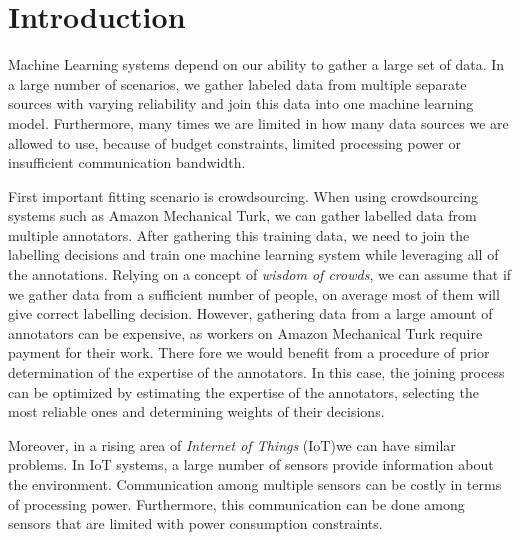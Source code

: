 \documentclass{llncs}
\begin{document}
\section{Introduction}
Machine Learning systems depend on our ability to gather a large set of data. In a large number of scenarios, we gather labeled data from multiple separate sources with varying reliability and join this data into one machine learning model. Furthermore, many times we are limited in how many data sources we are allowed to use, because of budget constraints, limited processing power or insufficient communication bandwidth.

First important fitting scenario is crowdsourcing. When using crowdsourcing systems such as Amazon Mechanical Turk, we can gather labelled data from multiple annotators. After gathering this training data, we need to join the labelling decisions and train one machine learning system while leveraging all of the annotations. Relying on a concept of \textit{wisdom of crowds}, we can assume that if we gather data from a sufficient number of people, on average most of them will give correct labelling decision. However, gathering data from a large amount of annotators can be expensive, as workers on Amazon Mechanical Turk require payment for their work. There fore we would benefit from a procedure of prior determination of the expertise of the annotators. In this case, the joining process can be optimized by estimating the expertise of the annotators, selecting the most reliable ones and determining weights of their decisions. 

Moreover, in a rising area of \textit{Internet of Things} (IoT)we can have similar problems. In IoT systems, a large number of sensors provide information about the environment. Communication among multiple sensors can be costly in terms of processing power. Furthermore, this communication can be done among sensors that are limited with power consumption constraints.
\end{document}
